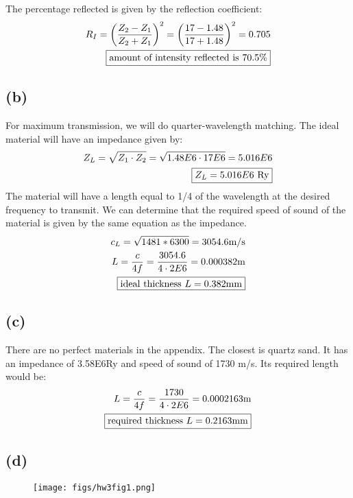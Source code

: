 \documentclass[12 pt]{article}
\begin{document}
The percentage reflected is given by the reflection coefficient:
\begin{align*}
    R_I=\left(\frac{Z_2-Z_1}{Z_2+Z_1}\right)^2=\left(\frac{17-1.48}{17+1.48}\right)^2=0.705 \\
    \fbox{amount of intensity reflected is 70.5\%}
\end{align*}

\subsection*{(b)}
For maximum transmission, we will do quarter-wavelength matching. The ideal material will have an impedance given by:
\begin{align*}
    Z_L=\sqrt{Z_1\cdot Z_2}=\sqrt{1.48E6\cdot 17E6}=5.016E6 \\
    \fbox{$Z_L=5.016E6$ Ry}
\end{align*}
The material will have a length equal to 1/4 of the wavelength at the desired frequency to transmit. We can determine
that the required speed of sound of the material is given by the same equation as the impedance.
\begin{align*}
    c_L = \sqrt{1481*6300}=3054.6\text{m/s} \\
    L=\frac{c}{4f}=\frac{3054.6}{4\cdot 2E6}=0.000382\text{m} \\
    \fbox{ideal thickness $L=0.382$mm}
\end{align*}

\subsection*{(c)}
There are no perfect materials in the appendix. The closest is quartz sand. It has an impedance of 3.58E6Ry and speed of
sound of 1730 m/s. Its required length would be:
\begin{align*}
    L=\frac{c}{4f}=\frac{1730}{4\cdot 2E6}=0.0002163\text{m} \\
    \fbox{required thickness $L=0.2163$mm}
\end{align*}

\subsection*{(d)}
\begin{figure}[H]
    \centering
    \texttt{[image: figs/hw3fig1.png]}
\end{figure}
\end{document}
